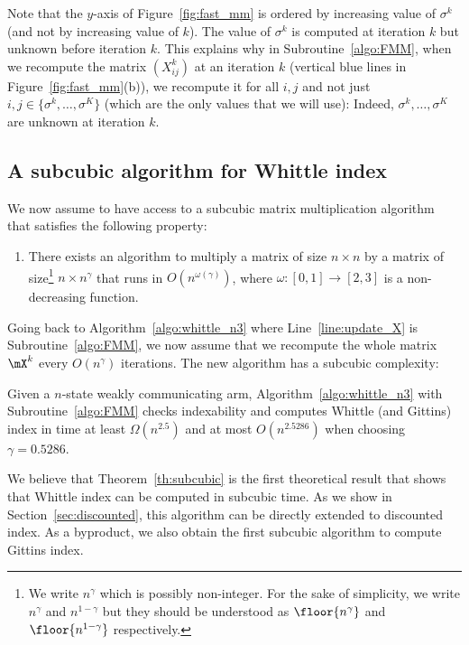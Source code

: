 Note that the $y$-axis of Figure~\ref{fig:fast_mm} is ordered by increasing value of $\sigma^k$ (and not by increasing value of $k$). The value of $\sigma^k$ is computed at iteration $k$ but unknown before iteration $k$. This explains why in Subroutine~\ref{algo:FMM}, when we recompute the matrix $(X^{k}_{ij})$ at an iteration $k$ (vertical blue lines in Figure~\ref{fig:fast_mm}(b)), we recompute it for all $i,j$ and not just $i,j\in\{\sigma^{k}, \dots, \sigma^K\}$ (which are the only values that we will use): Indeed, $\sigma^{k}, \dots, \sigma^K$ are unknown at iteration $k$. 

\subsection{A subcubic algorithm for Whittle index}

We now assume to have access to a subcubic matrix multiplication algorithm that satisfies the following property:
\begin{enumerate}[label=(FMM)]    
    \item \label{hypo:FMM} There exists an algorithm to multiply a matrix of size $n\times n$ by a matrix of size\footnote{We write $n^\gamma$ which is possibly non-integer. For the sake of simplicity, we write $n^\gamma$ and $n^{1-\gamma}$ but they should be understood as $\floor{n^\gamma}$ and $\floor{n^{1-\gamma}}$ respectively.} $n\times  n^\gamma $ that runs in $O(n^{\omega(\gamma)})$, where $\omega:[0,1]\to[2,3]$ is a non-decreasing function.
\end{enumerate}

Going back to Algorithm~\ref{algo:whittle_n3} where Line~\ref{line:update_X} is Subroutine~\ref{algo:FMM}, we now assume that we recompute the whole matrix $\mX^k$ every $O(n^\gamma)$ iterations. The new algorithm has a subcubic complexity:

\begin{thm}
    \label{th:subcubic}
    Given a $n$-state weakly communicating arm, Algorithm~\ref{algo:whittle_n3} with Subroutine~\ref{algo:FMM} checks indexability and computes Whittle (and Gittins) index in time at least $\Omega(n^{2.5})$ and at most $O(n^{2.5286})$ when choosing $\gamma=0.5286$.
\end{thm}

We believe that Theorem~\ref{th:subcubic} is the first theoretical result that shows that Whittle index can be computed in subcubic time. As we show in Section~\ref{sec:discounted}, this algorithm can be directly extended to discounted index. As a byproduct, we also obtain the first subcubic algorithm to compute Gittins index.


